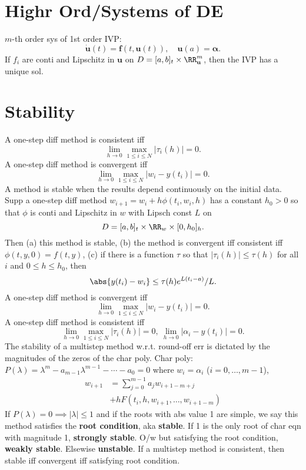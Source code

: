 \documentclass[b4paper,10pt]{memoir}
\begin{document}
\begin{multicols*}{3}
    \setcounter{section}{8}
    \section{Highr Ord/Systems of DE}
    \s $m$-th order sys of 1st order IVP:
    \[ \dot{\mathbf u}(t) = \mathbf f(t,\mathbf u(t)),\quad \mathbf u(a)=\boldsymbol\alpha. \]
    If $f_i$ are conti and Lipschitz in $\mathbf u$ on $D=[a,b]_t\times \RR^m_{\mathbf u}$, then the IVP has a unique sol.

    \section{Stability}
    \s A one-step diff method is consistent iff
    \[ \lim_{h\to 0}\max_{1 \le i \le N} |\tau_i(h)| = 0.  \]
    \s A one-step diff method is convergent iff
    \[ \lim_{h\to 0}\max_{1 \le i \le N} |w_i - y(t_i)| = 0.  \]
    \s A method is stable when the results depend continuously on the initial data.\nl
    \s Supp a one-step diff method $w_{i+1}=w_i+h\phi(t_i,w_i,h)$ has a constant $h_0>0$ so that $\phi$ is conti and Lipschitz in $w$ with Lipsch const $L$ on
    \[ D = [a,b]_t\times \RR_w \times [0,h_0]_h. \]
    Then (a) this method is stable, (b) the method is convergent iff consistent iff $\phi(t,y,0)=f(t,y)$, (c) if there is a function $\tau$ so that $|\tau_i(h)|\le \tau(h)$ for all $i$ and $0\le h\le h_0$, then
    \[ \abs{y(t_i) - w_i} \le \tau(h) e^{L(t_i-a)}/L. \]
    \s A one-step diff method is convergent iff
    \[ \lim_{h\to 0}\max_{1 \le i \le N} |w_i - y(t_i)| = 0.  \]
    \s A one-step diff method is consistent iff
    \[ \lim_{h\to 0}\max_{1 \le i \le N} |\tau_i(h)| = 0,\  \lim_{h\to 0}|\alpha_i-y(t_i)| =0.  \]
    \s The stability of a multistep method w.r.t. round-off err is dictated by the magnitudes of the zeros of the char poly. \nl
    \s Char poly: $P(\lambda) = \lambda^m-a_{m-1}\lambda^{m-1} - \cdots - a_0 = 0$ where $w_i = \alpha_i$ ($i=0,\dots,m-1$),
    \begin{align*}
        w_{i+1} & \textstyle = \sum_{j=0}^{m-1} a_j w_{i+1-m+j} \\&+ hF(t_i,h,w_{i+1},\dots,w_{i+1-m})
    \end{align*}
    If $P(\lambda)=0\implies |\lambda|\le 1$ and if the roots with abs value 1 are simple, we say this method satisfies the \textbf{root condition}, aka \textbf{stable}. \nl If 1 is the only root of char eqn with magnitude 1, \textbf{strongly stable}. O/w but satisfying the root condition, \textbf{weakly stable}. Elsewise \textbf{unstable}.\nl
    \s If a multistep method is consistent, then stable iff convergent iff satisfying root condition.


\end{multicols*}
\end{document}
